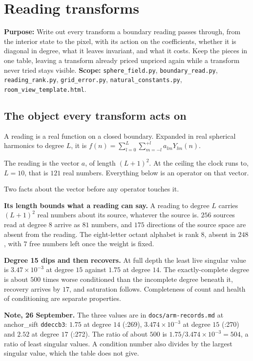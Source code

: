 \chapter{Reading transforms}

\textbf{Purpose:} Write out every transform a boundary reading passes through, from the interior state to the pixel, with its action on the coefficients, whether it is diagonal in degree, what it leaves invariant, and what it costs. Keep the pieces in one table, leaving a transform already priced unpriced again while a transform never tried stays visible. \textbf{Scope:} \texttt{sphere\_field.py}, \texttt{boundary\_read.py}, \texttt{reading\_rank.py}, \texttt{grid\_error.py}, \texttt{natural\_constants.py}, \texttt{room\_view\_template.html}.

\section{The object every transform acts on}

A reading is a real function on a closed boundary. Expanded in real spherical harmonics to degree \(L\), it is \(f(n) = \sum_{l=0}^{L} \sum_{m=-l}^{+l} a_{lm} Y_{lm}(n)\).

The reading is the vector \(a\), of length \((L+1)^2\). At the ceiling the clock runs to, \(L = 10\), that is \(121\) real numbers. Everything below is an operator on that vector.

Two facts about the vector before any operator touches it.

\textbf{Its length bounds what a reading can say.} A reading to degree \(L\) carries \((L+1)^2\) real numbers about its source, whatever the source is. \(256\) sources read at degree \(8\) arrive as \(81\) numbers, and \(175\) directions of the source space are absent from the reading. The eight-letter octant alphabet is rank \(8\), absent in \(248\), with \(7\) free numbers left once the weight is fixed.

\textbf{Degree 15 dips and then recovers.} At full depth the least live singular value is \(3.47 \times 10^{-3}\) at degree \(15\) against \(1.75\) at degree \(14\). The exactly-complete degree is about \(500\) times worse conditioned than the incomplete degree beneath it, recovery arrives by \(17\), and saturation follows. Completeness of count and health of conditioning are separate properties.

\textbf{Note, 26 September.} The three values are in \texttt{docs/\allowbreak{}arm-records.md} at anchor\_sift \texttt{ddeccb3}: \(1.75\) at degree \(14\) (:269), \(3.474 \times 10^{-3}\) at degree \(15\) (:270) and \(2.52\) at degree \(17\) (:272). The ratio of about \(500\) is \(1.75 / 3.474 \times 10^{-3} = 504\), a ratio of least singular values. A condition number also divides by the largest singular value, which the table does not give.

